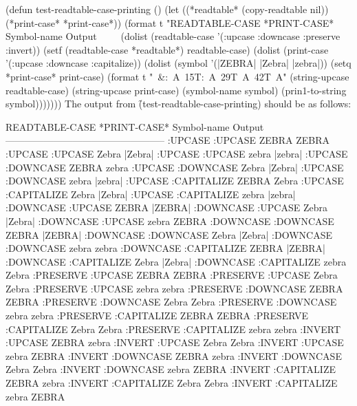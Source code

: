 \code
 (defun test-readtable-case-printing ()
   (let ((*readtable* (copy-readtable nil))
         (*print-case* *print-case*))
     (format t "READTABLE-CASE *PRINT-CASE*  Symbol-name  Output~
              ~%
              ~%
     (dolist (readtable-case '(:upcase :downcase :preserve :invert))
       (setf (readtable-case *readtable*) readtable-case)
       (dolist (print-case '(:upcase :downcase :capitalize))
         (dolist (symbol '(|ZEBRA| |Zebra| |zebra|))
           (setq *print-case* print-case)
           (format t "~&:~A~15T:~A~29T~A~42T~A"
                   (string-upcase readtable-case)
                   (string-upcase print-case)
                   (symbol-name symbol)
                   (prin1-to-string symbol)))))))
\endcode
  The output from \f{(test-readtable-case-printing)} should be as follows:

\code
    READTABLE-CASE *PRINT-CASE*  Symbol-name  Output
    --------------------------------------------------
    :UPCASE        :UPCASE       ZEBRA        ZEBRA
    :UPCASE        :UPCASE       Zebra        |Zebra|
    :UPCASE        :UPCASE       zebra        |zebra|
    :UPCASE        :DOWNCASE     ZEBRA        zebra
    :UPCASE        :DOWNCASE     Zebra        |Zebra|
    :UPCASE        :DOWNCASE     zebra        |zebra|
    :UPCASE        :CAPITALIZE   ZEBRA        Zebra
    :UPCASE        :CAPITALIZE   Zebra        |Zebra|
    :UPCASE        :CAPITALIZE   zebra        |zebra|
    :DOWNCASE      :UPCASE       ZEBRA        |ZEBRA|
    :DOWNCASE      :UPCASE       Zebra        |Zebra|
    :DOWNCASE      :UPCASE       zebra        ZEBRA
    :DOWNCASE      :DOWNCASE     ZEBRA        |ZEBRA|
    :DOWNCASE      :DOWNCASE     Zebra        |Zebra|
    :DOWNCASE      :DOWNCASE     zebra        zebra
    :DOWNCASE      :CAPITALIZE   ZEBRA        |ZEBRA|
    :DOWNCASE      :CAPITALIZE   Zebra        |Zebra|
    :DOWNCASE      :CAPITALIZE   zebra        Zebra
    :PRESERVE      :UPCASE       ZEBRA        ZEBRA
    :PRESERVE      :UPCASE       Zebra        Zebra
    :PRESERVE      :UPCASE       zebra        zebra
    :PRESERVE      :DOWNCASE     ZEBRA        ZEBRA
    :PRESERVE      :DOWNCASE     Zebra        Zebra
    :PRESERVE      :DOWNCASE     zebra        zebra
    :PRESERVE      :CAPITALIZE   ZEBRA        ZEBRA
    :PRESERVE      :CAPITALIZE   Zebra        Zebra
    :PRESERVE      :CAPITALIZE   zebra        zebra
    :INVERT        :UPCASE       ZEBRA        zebra
    :INVERT        :UPCASE       Zebra        Zebra
    :INVERT        :UPCASE       zebra        ZEBRA
    :INVERT        :DOWNCASE     ZEBRA        zebra
    :INVERT        :DOWNCASE     Zebra        Zebra
    :INVERT        :DOWNCASE     zebra        ZEBRA
    :INVERT        :CAPITALIZE   ZEBRA        zebra
    :INVERT        :CAPITALIZE   Zebra        Zebra
    :INVERT        :CAPITALIZE   zebra        ZEBRA
\endcode

